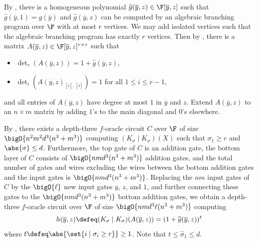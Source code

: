 \documentclass[letterpaper, 11pt]{amsart}
\begin{document}
\begin{pf}
    By , there is a homogeneous polynomial $\widehat{g}(\overline{y}, z) \in \F[\overline{y}, z]$ such that $\widehat{g}(\overline{y}, 1) = g(\overline{y})$ and $\widehat{g}(\overline{y}, z)$ can be computed by an algebraic branching program over $\F$ with at most $r$ vertices.
    We may add isolated vertices such that the algebraic branching program has exactly $r$ vertices.
    Then by , there is a matrix $A(\overline{y}, z) \in \F[\overline{y}, z]^{r \times r}$  such that
    \begin{itemize}
        \item $\det_r(A(\overline{y}, z)) = 1 + \widehat{g}(\overline{y}, z)$,
        \item $\det_i(A(\overline{y}, z)_{[i], [i]}) = 1$ for all $1 \leq i \leq r - 1$,
    \end{itemize}
    and all entries of $A(\overline{y}, z)$ have degree at most $1$ in $\overline{y}$ and $z$.  
    Extend $A(\overline{y}, z)$ to an $n\times m$ matrix by adding $1$'s to the main diagonal and $0$'s elsewhere.

   By , there exists a depth-three $f$-oracle circuit $C$ over $\F$ of size $\bigO{n^2m^2d^3(n^3+m^3)}$ computing $(K_\sigma \mid K_\sigma)(X)$ such that $\sigma_1 \geq r$ and $\abs{\sigma} \leq d$.
   Furthermore, the top gate of $C$ is an addition gate, the bottom layer of $C$ consists of $\bigO{nmd^3(n^3+m^3)}$ addition gates, and the total number of gates and wires excluding the wires between the bottom addition gates and the input gates is $\bigO{nmd^3(n^3+m^3)}$.
   Replacing the $nm$ input gates of $C$ by the $\bigO{\ell}$ new input gates $\overline{y}$, $z$, and $1$, and further connecting these gates to the $\bigO{nmd^3(n^3+m^3)}$ bottom addition gates, we obtain a depth-three $f$-oracle circuit over $\F$ of size $\bigO{nmd^3\ell(n^3+m^3)}$ computing 
    \[
        h(\overline{y}, z) \defeq(K_\sigma \mid K_\sigma)(A(\overline{y}, z)) = (1 + \widehat{g}(\overline{y}, z))^t
    \]
    where $t \defeq \abs{\set{i \mid \sigma_i \geq r}} \geq 1$.
    Note that $t \leq \widehat{\sigma}_1 \leq d$.
    

\end{pf}
\end{document}
